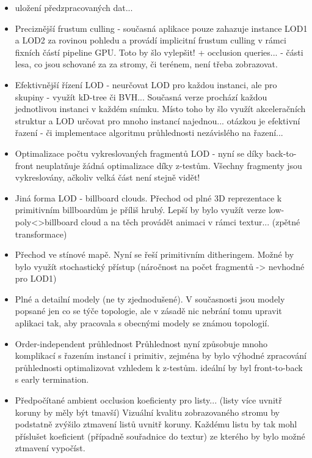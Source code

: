 \begin{itemize}
\item uložení předzpracovaných dat...

\item Preciznější frustum culling - současná aplikace pouze zahazuje instance LOD1 a LOD2 za rovinou pohledu a provádí implicitní frustum culling v rámci fixních částí pipeline GPU. Toto by šlo vylepšit! + occlusion queries... - části lesa, co jsou schované za za stromy, či terénem, není třeba zobrazovat.

\item Efektivnější řízení LOD - neurčovat LOD pro každou instanci, ale pro skupiny - využít kD-tree či BVH... Současná verze prochází každou jednotlivou instanci v každém snímku. Místo toho by šlo využít akceleračních struktur a LOD určovat pro mnoho instancí najednou... otázkou je efektivní řazení - či implementace algoritmu průhlednosti nezávislého na řazení...

\item Optimalizace počtu vykreslovaných fragmentů LOD - nyní se díky back-to-front neuplatňuje žádná optimalizace díky z-testům. Všechny fragmenty jsou vykreslovány, ačkoliv velká část není stejně vidět!

\item Jiná forma LOD - billboard clouds. Přechod od plné 3D reprezentace k primitivním billboardům je příliš hrubý. Lepší by bylo využít verze low-poly<>billboard cloud a na těch provádět animaci v rámci textur... (zpětné transformace)



%
\item Přechod ve stínové mapě. Nyní se řeší primitivním ditheringem. Možné by bylo využít stochastický přístup (náročnost na počet fragmentů -> nevhodné pro LOD1)

\item Plné a detailní modely (ne ty zjednodušené). V současnosti jsou modely popsané jen co se týče topologie, ale v zásadě nic nebrání tomu upravit aplikaci tak, aby pracovala s obecnými modely se známou topologií.

\item Order-independent průhlednost
Průhlednost nyní způsobuje mnoho komplikací s řazením instancí i primitiv, zejména by bylo výhodné zpracování průhlednosti optimalizovat vzhledem k z-testům. ideální by byl front-to-back s early termination.


\item Předpočítané ambient occlusion koeficienty pro listy... (listy více uvnitř koruny by měly být tmavší)
Vizuální kvalitu zobrazovaného stromu by podstatně zvýšilo ztmavení listů uvnitř koruny. Každému listu by tak mohl příslušet koeficient (případně souřadnice do textur) ze kterého by bylo možné ztmavení vypočíst.


\end{itemize}
